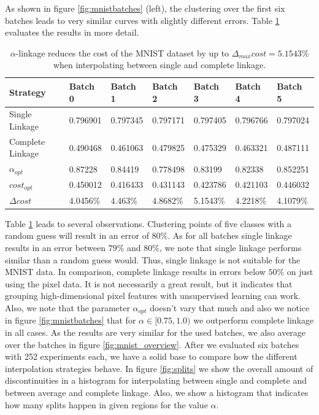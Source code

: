As shown in figure \ref{fig:mnistbatches} (left), the clustering over the first six batches leads to very similar curves with slightly different errors. Table \ref{table:mnistscbatches} evaluates the results in more detail.

\begin{table}[H]
    \centering
    \begin{tabular}{|l | l l l l l l |}
    \hline
    Strategy & Batch 0 & Batch 1 & Batch 2 & Batch 3 & Batch 4 & Batch 5\\ \hline
    Single Linkage & 0.796901 & 0.797345 & 0.797171 & 0.797405 & 0.796766 & 0.797024\\
    Complete Linkage & 0.490468 & 0.461063 & 0.479825 & 0.475329 & 0.463321 & 0.487111\\
    $\alpha_{opt}$ & 0.87228 & 0.84419 & 0.778498 & 0.83199 & 0.82338 & 0.852251\\
    $cost_{opt}$ & 0.450012 & 0.416433 & 0.431143 & 0.423786 & 0.421103 & 0.446032\\
    $\Delta cost$ & 4.0456\% & 4.463\% & 4.8682\% & 5.1543\% & 4.2218\% & 4.1079\%\\\hline
    \end{tabular}
    \caption{$\alpha$-linkage reduces the cost of the MNIST dataset by up to $\Delta_{max} cost = 5.1543\%$ when interpolating between single and complete linkage.}
    \label{table:mnistscbatches}
\end{table}

Table \ref{table:mnistscbatches} leads to several observations. Clustering points of five classes with a random guess will result in an error of $80\%$. As for all batches single linkage results in an error between $79\%$ and $80\%$, we note that single linkage performs similar than a random guess would. Thus, single linkage is not suitable for the MNIST data. In comparison, complete linkage results in errors below $50\%$ on just using the pixel data. It is not necessarily a great result, but it indicates that grouping high-dimensional pixel features with unsupervised learning can work. Also, we note that the parameter $\alpha_{opt}$ doesn't vary that much and also we notice in figure \ref{fig:mnistbatches} that for $\alpha \in [0.75,1.0)$ we outperform complete linkage in all cases. As the results are very similar for the used batches, we also average over the batches in figure \ref{fig:mnist_overview}. After we evaluated six batches with 252 experiments each, we have a solid base to compare how the different interpolation strategies behave. In figure \ref{fig:splits} we show the overall amount of discontinuities in a histogram for interpolating between single and complete and between average and complete linkage. Also, we show a histogram that indicates how many splits happen in given regions for the value $\alpha$.


